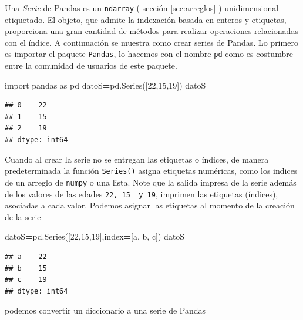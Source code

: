 \documentclass[
]{book}
\newenvironment{Shaded}{\begin{snugshade}}{\end{snugshade}}
\newcommand{\DecValTok}[1]{\textcolor[rgb]{0.00,0.00,0.81}{#1}}
\newcommand{\ImportTok}[1]{#1}
\newcommand{\NormalTok}[1]{#1}
\newcommand{\OperatorTok}[1]{\textcolor[rgb]{0.81,0.36,0.00}{\textbf{#1}}}
\newcommand{\StringTok}[1]{\textcolor[rgb]{0.31,0.60,0.02}{#1}}
\theoremstyle{definition}
\theoremstyle{definition}
\theoremstyle{definition}
\theoremstyle{definition}
\theoremstyle{remark}
\begin{document}
Una \emph{Serie} de Pandas es un \texttt{ndarray} ( sección \ref{sec:arreglos} ) unidimensional etiquetado. El objeto, que admite la indexación basada en enteros y etiquetas, proporciona una gran cantidad de métodos para realizar operaciones relacionadas con el índice. A continuación se muestra como crear series de Pandas. Lo primero es importar el paquete \texttt{Pandas}, lo hacemos con el nombre \texttt{pd} como es costumbre entre la comunidad de usuarios de este paquete.

\begin{Shaded}
\begin{Highlighting}[]
\ImportTok{import}\NormalTok{ pandas }\ImportTok{as}\NormalTok{ pd}
\NormalTok{datoS}\OperatorTok{=}\NormalTok{pd.Series([}\DecValTok{22}\NormalTok{,}\DecValTok{15}\NormalTok{,}\DecValTok{19}\NormalTok{]) }
\NormalTok{datoS}
\end{Highlighting}
\end{Shaded}

\begin{verbatim}
## 0    22
## 1    15
## 2    19
## dtype: int64
\end{verbatim}

Cuando al crear la serie no se entregan las etiquetas o índices, de manera predeterminada la función \texttt{Series()} asigna etiquetas numéricas, como los indices de un arreglo de \texttt{numpy} o una lista. Note que la salida impresa de la serie además de los valores de las edades \texttt{22,\ 15\ \ y\ 19}, imprimen las etiquetas (índices), asociadas a cada valor. Podemos asignar las etiquetas al momento de la creación de la serie

\begin{Shaded}
\begin{Highlighting}[]
\NormalTok{datoS}\OperatorTok{=}\NormalTok{pd.Series([}\DecValTok{22}\NormalTok{,}\DecValTok{15}\NormalTok{,}\DecValTok{19}\NormalTok{],index}\OperatorTok{=}\NormalTok{[}\StringTok{\textquotesingle{}a\textquotesingle{}}\NormalTok{, }\StringTok{\textquotesingle{}b\textquotesingle{}}\NormalTok{, }\StringTok{\textquotesingle{}c\textquotesingle{}}\NormalTok{]) }
\NormalTok{datoS}
\end{Highlighting}
\end{Shaded}

\begin{verbatim}
## a    22
## b    15
## c    19
## dtype: int64
\end{verbatim}

podemos convertir un diccionario a una serie de Pandas
\end{document}
